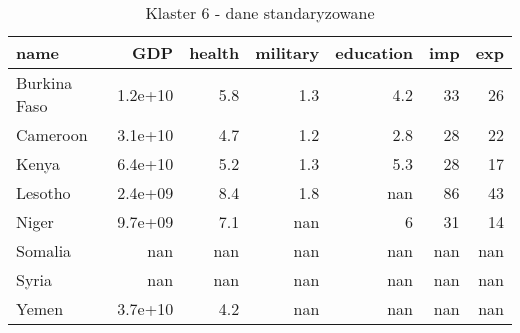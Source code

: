 \begin{table}
    \centering
    \caption{Klaster 6 - dane standaryzowane}
    \label{tab:cl6std}
    \begin{tabular}{lrrrrrr}
        \toprule
        name         & GDP     & health & military & education & imp & exp \\
        \midrule
        Burkina Faso & 1.2e+10 & 5.8    & 1.3      & 4.2       & 33  & 26  \\
        Cameroon     & 3.1e+10 & 4.7    & 1.2      & 2.8       & 28  & 22  \\
        Kenya        & 6.4e+10 & 5.2    & 1.3      & 5.3       & 28  & 17  \\
        Lesotho      & 2.4e+09 & 8.4    & 1.8      & nan       & 86  & 43  \\
        Niger        & 9.7e+09 & 7.1    & nan      & 6         & 31  & 14  \\
        Somalia      & nan     & nan    & nan      & nan       & nan & nan \\
        Syria        & nan     & nan    & nan      & nan       & nan & nan \\
        Yemen        & 3.7e+10 & 4.2    & nan      & nan       & nan & nan \\
        \bottomrule
    \end{tabular}
\end{table}
